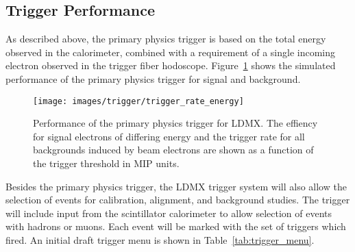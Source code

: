 
\subsection{Trigger Performance}

As described above, the primary physics trigger is based on the total
energy observed in the calorimeter, combined with a requirement of a
single incoming electron observed in the trigger fiber hodoscope.
Figure~\ref{fig:trigger_rejection} shows the simulated performance of
the primary physics trigger for signal and background.

\begin{figure}[t]
  \begin{center}
    \texttt{[image: images/trigger/trigger\_rate\_energy]}
    \end{center}
  \caption{Performance of the primary physics trigger for LDMX.  The
    effiency for signal electrons of differing energy and the trigger
    rate for all backgrounds induced by beam electrons are shown as a
    function of the trigger threshold in MIP
    units.}\label{fig:trigger_rejection}
\end{figure}

Besides the primary physics trigger, the LDMX trigger system will also
allow the selection of events for calibration, alignment, and
background studies.  The trigger will include input from the
scintillator calorimeter to allow selection of events with hadrons or
muons.  Each event will be marked with the set of triggers which
fired.  An initial draft trigger menu is shown in Table~\ref{tab:trigger_menu}.

